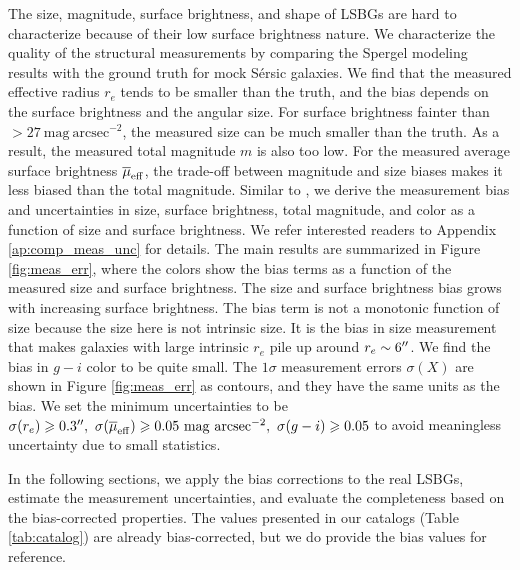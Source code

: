 \documentclass[twocolumn,astrosymb,twocolappendix]{aastex631}
\newcommand{\sbunit}{\mathrm{mag\ arcsec}^{-2}}
\newcommand{\sersic}{S\'ersic}
\begin{document}
\begin{CJK*}{UTF8}{gbsn}
The size, magnitude, surface brightness, and shape of LSBGs are hard to characterize because of their low surface brightness nature. We characterize the quality of the structural measurements by comparing the Spergel modeling results with the ground truth for mock \sersic{} galaxies. We find that the measured effective radius $r_e$ tends to be smaller than the truth, and the bias depends on the surface brightness and the angular size. For surface brightness fainter than $>27\ \sbunit$, the measured size can be much smaller than the truth. As a result, the measured total magnitude $m$ is also too low. For the measured average surface brightness $\overline{\mu}_{\rm eff}$, the trade-off between magnitude and size biases makes it less biased than the total magnitude. Similar to \citet{Zaritsky2021}, we derive the measurement bias and uncertainties in size, surface brightness, total magnitude, and color as a function of size and surface brightness. We refer interested readers to Appendix \ref{ap:comp_meas_unc} for details. The main results are summarized in Figure \ref{fig:meas_err}, where the colors show the bias terms as a function of the measured size and surface brightness. The size and surface brightness bias grows with increasing surface brightness. The bias term is not a monotonic function of size because the size here is not intrinsic size. It is the bias in size measurement that makes galaxies with large intrinsic $r_e$ pile up around $r_e\sim 6\mbox{$^{\prime\prime}$}$. We find the bias in $g-i$ color to be quite small. The $1\sigma$ measurement errors $\sigma(X)$ are shown in Figure \ref{fig:meas_err} as contours, and they have the same units as the bias. We set the minimum uncertainties to be $\sigma(r_e) \geqslant 0.3\arcsec,\ \sigma(\overline{\mu}_{\rm eff}) \geqslant 0.05\ \sbunit,\ \sigma(g-i) \geqslant 0.05$ to avoid meaningless uncertainty due to small statistics. 

In the following sections, we apply the bias corrections to the real LSBGs, estimate the measurement uncertainties, and evaluate the completeness based on the bias-corrected properties. 
The values presented in our catalogs (Table \ref{tab:catalog}) are already bias-corrected, but we do provide the bias values for reference. 



\end{CJK*}
\end{document}
